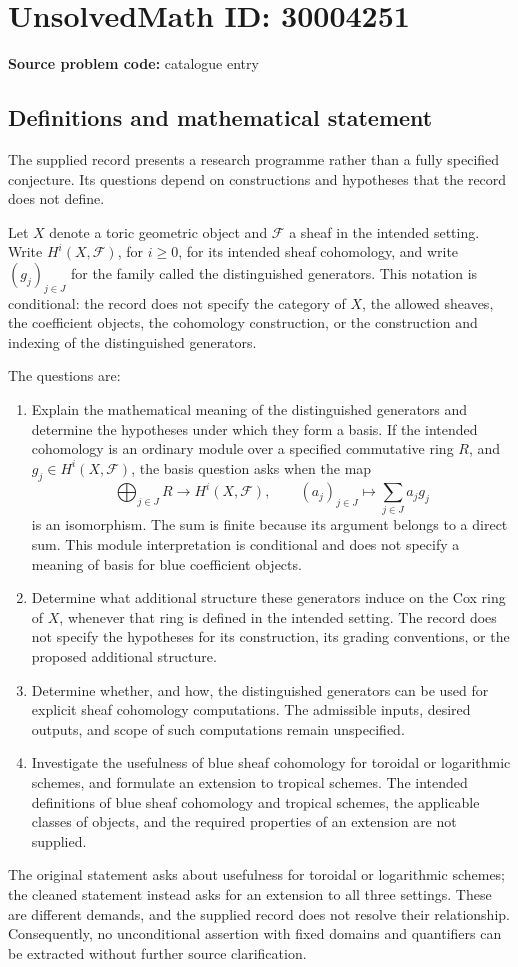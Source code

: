 \documentclass[11pt]{article}
\begin{document}
\section*{UnsolvedMath ID: 30004251}
\textbf{Source problem code:} catalogue entry
\subsection{Definitions and mathematical statement}
The supplied record presents a research programme rather than a fully specified conjecture. Its questions depend on constructions and hypotheses that the record does not define.

Let \(X\) denote a toric geometric object and \(\mathcal F\) a sheaf in the intended setting. Write \(H^i(X,\mathcal F)\), for \(i\geq 0\), for its intended sheaf cohomology, and write \((g_j)_{j\in J}\) for the family called the distinguished generators. This notation is conditional: the record does not specify the category of \(X\), the allowed sheaves, the coefficient objects, the cohomology construction, or the construction and indexing of the distinguished generators.

The questions are:
\begin{enumerate}
\item Explain the mathematical meaning of the distinguished generators and determine the hypotheses under which they form a basis. If the intended cohomology is an ordinary module over a specified commutative ring \(R\), and \(g_j\in H^i(X,\mathcal F)\), the basis question asks when the map
\[
\bigoplus_{j\in J} R\longrightarrow H^i(X,\mathcal F),\qquad (a_j)_{j\in J}\longmapsto\sum_{j\in J}a_jg_j
\]
is an isomorphism. The sum is finite because its argument belongs to a direct sum. This module interpretation is conditional and does not specify a meaning of basis for blue coefficient objects.
\item Determine what additional structure these generators induce on the Cox ring of \(X\), whenever that ring is defined in the intended setting. The record does not specify the hypotheses for its construction, its grading conventions, or the proposed additional structure.
\item Determine whether, and how, the distinguished generators can be used for explicit sheaf cohomology computations. The admissible inputs, desired outputs, and scope of such computations remain unspecified.
\item Investigate the usefulness of blue sheaf cohomology for toroidal or logarithmic schemes, and formulate an extension to tropical schemes. The intended definitions of blue sheaf cohomology and tropical schemes, the applicable classes of objects, and the required properties of an extension are not supplied.
\end{enumerate}
The original statement asks about usefulness for toroidal or logarithmic schemes; the cleaned statement instead asks for an extension to all three settings. These are different demands, and the supplied record does not resolve their relationship. Consequently, no unconditional assertion with fixed domains and quantifiers can be extracted without further source clarification.
\end{document}
